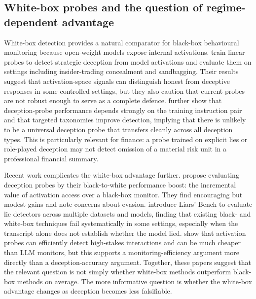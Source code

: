 \subsection{White-box probes and the question of regime-dependent advantage}

White-box detection provides a natural comparator for black-box behavioural monitoring because open-weight models expose internal activations. \citet{goldowskydill2025linearprobes} train linear probes to detect strategic deception from model activations and evaluate them on settings including insider-trading concealment and sandbagging. Their results suggest that activation-space signals can distinguish honest from deceptive responses in some controlled settings, but they also caution that current probes are not robust enough to serve as a complete defence. \citet{natarajan2026deceptionprobes} further show that deception-probe performance depends strongly on the training instruction pair and that targeted taxonomies improve detection, implying that there is unlikely to be a universal deception probe that transfers cleanly across all deception types. This is particularly relevant for finance: a probe trained on explicit lies or role-played deception may not detect omission of a material risk unit in a professional financial summary.

Recent work complicates the white-box advantage further. \citet{parrack2025blacktowhite} propose evaluating deception probes by their black-to-white performance boost: the incremental value of activation access over a black-box monitor. They find encouraging but modest gains and note concerns about evasion. \citet{kretschmar2025liarsbench} introduce Liars' Bench to evaluate lie detectors across multiple datasets and models, finding that existing black- and white-box techniques fail systematically in some settings, especially when the transcript alone does not establish whether the model lied. \citet{mckenzie2025highstakes} show that activation probes can efficiently detect high-stakes interactions and can be much cheaper than LLM monitors, but this supports a monitoring-efficiency argument more directly than a deception-accuracy argument. Together, these papers suggest that the relevant question is not simply whether white-box methods outperform black-box methods on average. The more informative question is whether the white-box advantage changes as deception becomes less falsifiable.

